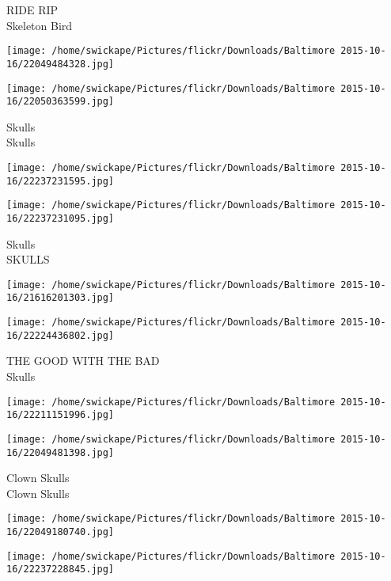 \documentclass[10pt,letterpaper]{article}
\begin{document}
RIDE RIP\\
Skeleton Bird\\
\pagebreak

\texttt{[image: /home/swickape/Pictures/flickr/Downloads/Baltimore 2015-10-16/22049484328.jpg]}

\vspace{0.25in}
\texttt{[image: /home/swickape/Pictures/flickr/Downloads/Baltimore 2015-10-16/22050363599.jpg]}

Skulls\\
Skulls\\
\pagebreak

\texttt{[image: /home/swickape/Pictures/flickr/Downloads/Baltimore 2015-10-16/22237231595.jpg]}

\vspace{0.25in}
\texttt{[image: /home/swickape/Pictures/flickr/Downloads/Baltimore 2015-10-16/22237231095.jpg]}

Skulls\\
SKULLS\\
\pagebreak

\texttt{[image: /home/swickape/Pictures/flickr/Downloads/Baltimore 2015-10-16/21616201303.jpg]}

\vspace{0.25in}
\texttt{[image: /home/swickape/Pictures/flickr/Downloads/Baltimore 2015-10-16/22224436802.jpg]}

THE GOOD WITH THE BAD\\
Skulls\\
\pagebreak

\texttt{[image: /home/swickape/Pictures/flickr/Downloads/Baltimore 2015-10-16/22211151996.jpg]}

\vspace{0.25in}
\texttt{[image: /home/swickape/Pictures/flickr/Downloads/Baltimore 2015-10-16/22049481398.jpg]}

Clown Skulls\\
Clown Skulls\\
\pagebreak

\texttt{[image: /home/swickape/Pictures/flickr/Downloads/Baltimore 2015-10-16/22049180740.jpg]}

\vspace{0.25in}
\texttt{[image: /home/swickape/Pictures/flickr/Downloads/Baltimore 2015-10-16/22237228845.jpg]}
\end{document}
